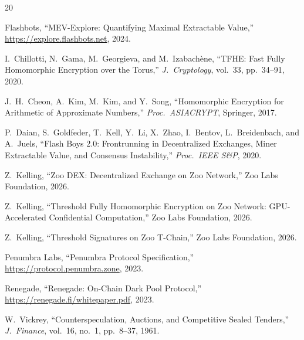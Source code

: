 \begin{thebibliography}{20}

Flashbots,
``MEV-Explore: Quantifying Maximal Extractable Value,''
\url{https://explore.flashbots.net}, 2024.

I.~Chillotti, N.~Gama, M.~Georgieva, and M.~Izabach\`{e}ne,
``TFHE: Fast Fully Homomorphic Encryption over the Torus,''
\textit{J.\ Cryptology}, vol.~33, pp.~34--91, 2020.

J.~H.~Cheon, A.~Kim, M.~Kim, and Y.~Song,
``Homomorphic Encryption for Arithmetic of Approximate Numbers,''
\textit{Proc.\ ASIACRYPT}, Springer, 2017.

P.~Daian, S.~Goldfeder, T.~Kell, Y.~Li, X.~Zhao, I.~Bentov, L.~Breidenbach, and A.~Juels,
``Flash Boys 2.0: Frontrunning in Decentralized Exchanges, Miner Extractable Value, and Consensus Instability,''
\textit{Proc.\ IEEE S\&P}, 2020.

Z.~Kelling,
``Zoo DEX: Decentralized Exchange on Zoo Network,''
Zoo Labs Foundation, 2026.

Z.~Kelling,
``Threshold Fully Homomorphic Encryption on Zoo Network: GPU-Accelerated Confidential Computation,''
Zoo Labs Foundation, 2026.

Z.~Kelling,
``Threshold Signatures on Zoo T-Chain,''
Zoo Labs Foundation, 2026.

Penumbra Labs,
``Penumbra Protocol Specification,''
\url{https://protocol.penumbra.zone}, 2023.

Renegade,
``Renegade: On-Chain Dark Pool Protocol,''
\url{https://renegade.fi/whitepaper.pdf}, 2023.

W.~Vickrey,
``Counterspeculation, Auctions, and Competitive Sealed Tenders,''
\textit{J.\ Finance}, vol.~16, no.~1, pp.~8--37, 1961.

\end{thebibliography}

